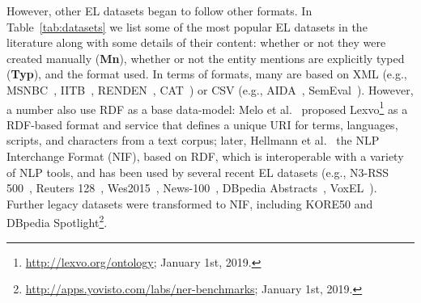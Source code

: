 \documentclass[sigconf]{acmart}
\begin{document}
However, other EL datasets began to follow other formats. In Table~\ref{tab:datasets} we list some of the most popular EL datasets in the literature along with some details of their content: whether or not they were created manually (\textbf{Mn}), whether or not the entity mentions are explicitly typed (\textbf{Typ}), and the format used. In terms of formats, many are based on XML (e.g., MSNBC~\cite{cucerzan2007large}, IITB~\cite{IITB2009}, RENDEN~\cite{renden2016}, CAT~\cite{meantime2016}) or CSV (e.g., AIDA~\cite{aida2011}, SemEval~\cite{moro2015semeval}). However, a number also use RDF as a base data-model: Melo et al.~\cite{Lexvo2008} proposed Lexvo\footnote{\url{http://lexvo.org/ontology}; January 1st, 2019.} as a RDF-based format and service that defines a unique URI for terms, languages, scripts, and characters from a text corpus; %
later, Hellmann et al.~\cite{NIFpaper} the NLP Interchange Format (NIF), based on RDF, which is interoperable with a variety of NLP tools, and has been used by several recent EL datasets (e.g., N3-RSS 500~\cite{N3}, Reuters 128~\cite{N3}, Wes2015~\cite{wes2015}, News-100~\cite{N3}, DBpedia Abstracts~\cite{abstracts2016}, VoxEL~\cite{VoxEL2018}). Further legacy datasets were transformed to NIF, including KORE50 and DBpedia Spotlight\footnote{\url{http://apps.yovisto.com/labs/ner-benchmarks}; January 1st, 2019.}.
\end{document}
